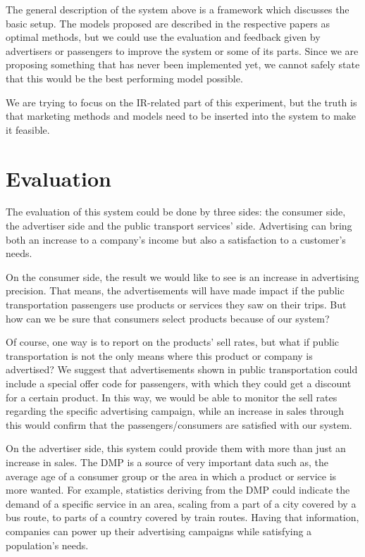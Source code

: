 \documentclass[letterpaper,11pt]{article}
\begin{document}
The general description of the system above is a framework which discusses the basic setup. The models proposed are described in the respective papers as optimal methods, but we could use the evaluation and feedback given by advertisers or passengers to improve the system or some of its parts. Since we are proposing something that has never been implemented yet, we cannot safely state that this would be the best performing model possible. 

We are trying to focus on the IR-related part of this experiment, but the truth is that marketing methods and models need to be inserted into the system to make it feasible.

\newpage


\section{Evaluation}

The evaluation of this system could be done by three sides: the consumer side, the advertiser side and the public transport services' side. Advertising can bring both an increase to a company's income but also a satisfaction to a customer's needs.

On the consumer side, the result we would like to see is an increase in advertising precision. That means, the advertisements will have made impact if the public transportation passengers use products or services they saw on their trips. But how can we be sure that consumers select products because of our system? 

Of course, one way is to report on the products' sell rates, but what if public transportation is not the only means where this product or company is advertised? We suggest that advertisements shown in public transportation could include a special offer code for passengers, with which they could get a discount for a certain product. In this way, we would be able to monitor the sell rates regarding the specific advertising campaign, while an increase in sales through this would confirm that the passengers/consumers are satisfied with our system.

On the advertiser side, this system could provide them with more than just an increase in sales. The DMP is a source of very important data such as, the average age of a consumer group or the area in which a product or service is more wanted. For example, statistics deriving from the DMP could indicate the demand of a specific service in an area, scaling from a part of a city covered by a bus route, to parts of a country covered by train routes. Having that information, companies can power up their advertising campaigns while satisfying a population's needs.
\end{document}

